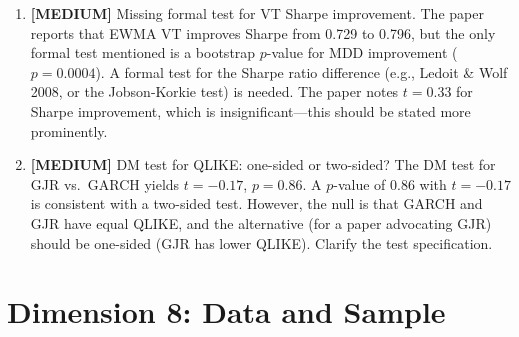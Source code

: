 \documentclass[12pt,a4paper]{article}
\newcommand{\MEDIUM}[1]{\textcolor{warncolor}{\textbf{[MEDIUM]} #1}}
\begin{document}
\begin{enumerate}[leftmargin=2em]
\item \MEDIUM{Missing formal test for VT Sharpe improvement.} The paper reports that EWMA VT improves Sharpe from 0.729 to 0.796, but the only formal test mentioned is a bootstrap $p$-value for MDD improvement ($p = 0.0004$). A formal test for the Sharpe ratio difference (e.g., Ledoit \& Wolf 2008, or the Jobson-Korkie test) is needed. The paper notes $t = 0.33$ for Sharpe improvement, which is insignificant---this should be stated more prominently.

\item \MEDIUM{DM test for QLIKE: one-sided or two-sided?} The DM test for GJR vs.\ GARCH yields $t = -0.17$, $p = 0.86$. A $p$-value of 0.86 with $t = -0.17$ is consistent with a two-sided test. However, the null is that GARCH and GJR have equal QLIKE, and the alternative (for a paper advocating GJR) should be one-sided (GJR has lower QLIKE). Clarify the test specification.

\end{enumerate}

\section{Dimension 8: Data and Sample}
\end{document}
